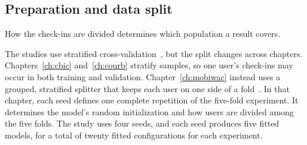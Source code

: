 \subsection{Preparation and data split}

How the check-ins are divided determines which population a result covers.

The studies use stratified cross-validation~\cite{kohavi1995crossval}, but the
split changes across chapters. Chapters~\ref{ch:cbic} and~\ref{ch:courb} stratify
samples, so one user's check-ins may occur in both training and validation.
Chapter~\ref{ch:mobiwac} instead uses a grouped, stratified splitter that keeps each
user on one side of a fold~\cite{pedregosa2011sklearn}. In that chapter, each seed
defines one complete repetition of the five-fold experiment. It determines the model's
random initialization and how users are divided among the five folds. The study uses
four seeds, and each seed produces five fitted models, for a total of twenty fitted configurations for each
experiment.

